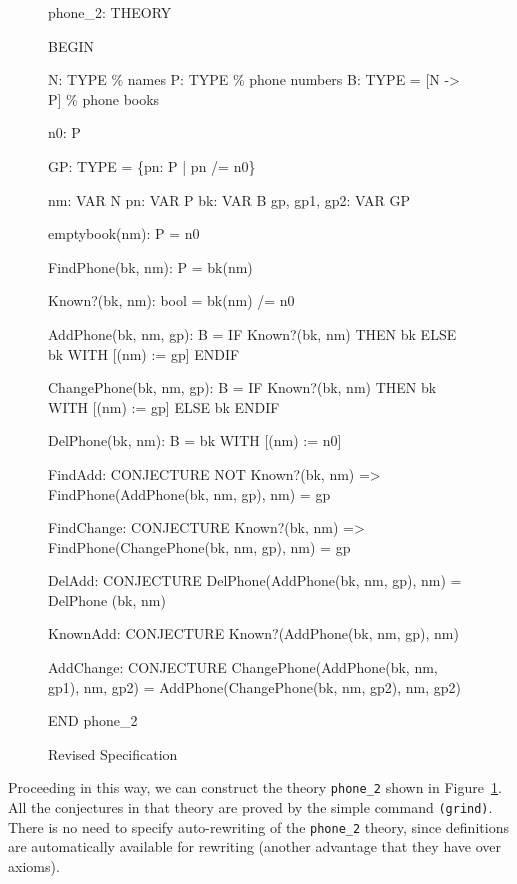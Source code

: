 \begin{figure}[htbp]
\begin{jmrsession}
phone_2: THEORY

BEGIN

  N: TYPE              \% names
  P: TYPE              \% phone numbers
  B: TYPE = [N -> P]   \% phone books

  n0: P

  GP: TYPE = \{pn: P | pn /= n0\}

  nm: VAR N
  pn: VAR P
  bk: VAR B
  gp, gp1, gp2: VAR GP

  emptybook(nm): P = n0

  FindPhone(bk, nm): P = bk(nm)

  Known?(bk, nm): bool = bk(nm) /= n0

  AddPhone(bk, nm, gp): B = 
    IF Known?(bk, nm) THEN bk ELSE bk WITH [(nm) := gp] ENDIF

  ChangePhone(bk, nm, gp): B = 
    IF Known?(bk, nm) THEN bk WITH [(nm) := gp] ELSE bk ENDIF

  DelPhone(bk, nm): B = bk WITH [(nm) := n0]

  FindAdd: CONJECTURE
    NOT Known?(bk, nm) => FindPhone(AddPhone(bk, nm, gp), nm) = gp

  FindChange: CONJECTURE
    Known?(bk, nm) => FindPhone(ChangePhone(bk, nm, gp), nm) = gp

  DelAdd: CONJECTURE
    DelPhone(AddPhone(bk, nm, gp), nm) = DelPhone (bk, nm)

  KnownAdd: CONJECTURE Known?(AddPhone(bk, nm, gp), nm)

  AddChange: CONJECTURE
    ChangePhone(AddPhone(bk, nm, gp1), nm, gp2) =
      AddPhone(ChangePhone(bk, nm, gp2), nm, gp2)

END phone_2
\end{jmrsession}
\caption{\label{fig2}Revised Specification}
\end{figure}
Proceeding in this way, we can construct the theory {\tt phone\_2}
shown in Figure~\ref{fig2}.  All the conjectures in that theory
are proved by the simple command {\tt (grind)}.   There is no need to
specify auto-rewriting of the {\tt phone\_2} theory, since definitions
are automatically available for rewriting (another advantage that they
have over axioms).

